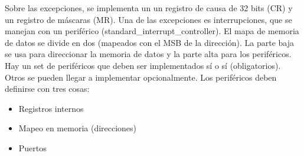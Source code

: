 Sobre las excepciones, se implementa un un registro de causa de 32 bits (CR) y un registro de máscaras (MR). Una de las excepciones es
interrupciones, que se manejan con un periférico (standard\_interrupt\_controller).
El mapa de memoria de datos se divide en dos (mapeados con el MSB de la dirección). La parte baja se usa para direccionar la memoria de
datos y la parte alta para los periféricos.
Hay un set de periféricos que deben ser implementados sí o sí (obligatorios). Otros se pueden llegar a implementar opcionalmente.
Los periféricos deben definirse con tres cosas:
\begin{itemize}
 \item Registros internos
 \item Mapeo en memoria (direcciones)
 \item Puertos
\end{itemize}

